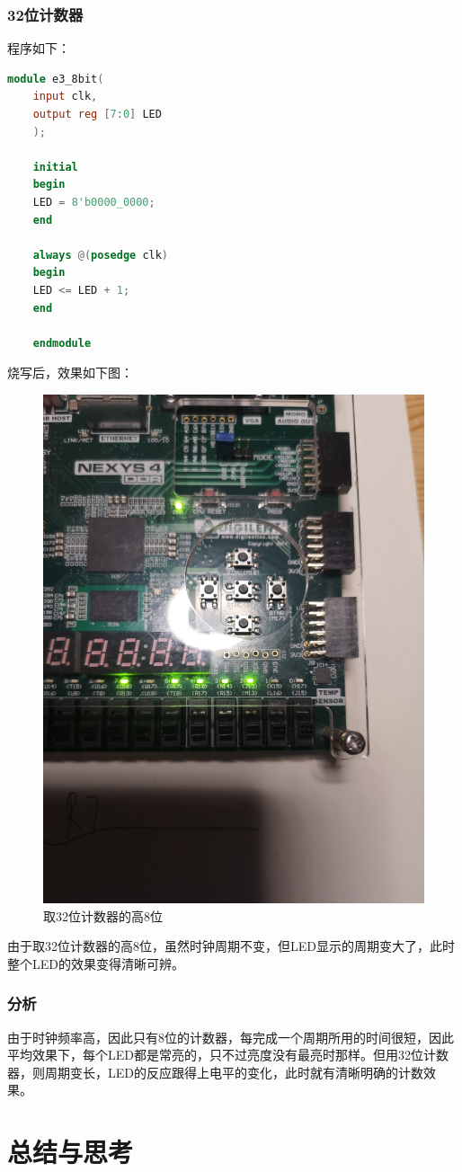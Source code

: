 \documentclass[UTF8]{article}
\begin{document}
	\subsubsection{32位计数器}
	程序如下：\par
	\begin{lstlisting}[language=Verilog]
	module e3_8bit(
	input clk,
	output reg [7:0] LED
	);
	
	initial
	begin
	LED = 8'b0000_0000;
	end
	
	always @(posedge clk)
	begin
	LED <= LED + 1;
	end
	
	endmodule
	\end{lstlisting}
	烧写后，效果如下图：\par
	\begin{figure}[H]
		\centering
		\includegraphics[width=0.5\linewidth]{e3_2.jpg}
		\caption{取32位计数器的高8位}
		\label{e3_2}
	\end{figure}\par
	由于取32位计数器的高8位，虽然时钟周期不变，但LED显示的周期变大了，此时整个LED的效果变得清晰可辨。\par
	
	\subsubsection{分析}
	由于时钟频率高，因此只有8位的计数器，每完成一个周期所用的时间很短，因此平均效果下，每个LED都是常亮的，只不过亮度没有最亮时那样。但用32位计数器，则周期变长，LED的反应跟得上电平的变化，此时就有清晰明确的计数效果。\par
	
	
	\section{总结与思考}	
\end{document}
